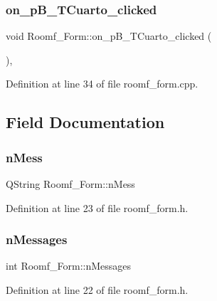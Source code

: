 \subsubsection{\texorpdfstring{on\+\_\+p\+B\+\_\+\+T\+Cuarto\+\_\+clicked}{on\_pB\_TCuarto\_clicked}}
{\footnotesize\ttfamily void Roomf\+\_\+\+Form\+::on\+\_\+p\+B\+\_\+\+T\+Cuarto\+\_\+clicked (\begin{DoxyParamCaption}{ }\end{DoxyParamCaption})\hspace{0.3cm}{\ttfamily [private]}, {\ttfamily [slot]}}



Definition at line 34 of file roomf\+\_\+form.\+cpp.



\subsection{Field Documentation}
\mbox{\label{class_roomf___form_aa3b0040875c0743836134fbc61ee4ddd}} 
\subsubsection{\texorpdfstring{n\+Mess}{nMess}}
{\footnotesize\ttfamily Q\+String Roomf\+\_\+\+Form\+::n\+Mess}



Definition at line 23 of file roomf\+\_\+form.\+h.

\mbox{\label{class_roomf___form_a1d86ac7246859ec80dc24d141bb9c1c7}} 
\subsubsection{\texorpdfstring{n\+Messages}{nMessages}}
{\footnotesize\ttfamily int Roomf\+\_\+\+Form\+::n\+Messages}



Definition at line 22 of file roomf\+\_\+form.\+h.

\mbox{\label{class_roomf___form_a19fcb5c555424b65791ad288225c47c4}} 
